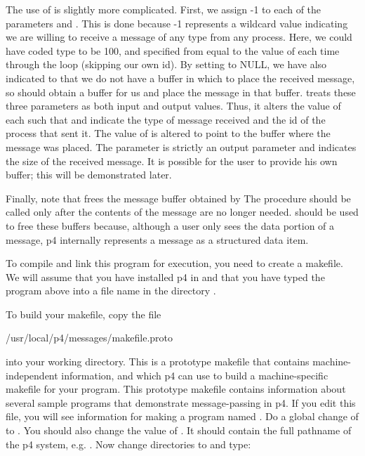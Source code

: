 The use of  is slightly more complicated.  First, we assign -1
to each of the parameters  and .  This is done because
-1 represents a wildcard value indicating we are willing to receive a message
of any type from any process.  Here, we could have coded type to be 100, and
specified from equal to the value of  each time through the loop
(skipping our own id).  By setting  to NULL, we have also
indicated to  that we do not have a buffer in which to place the
received message, so  should obtain a buffer for us and place
the message in that buffer.   treats these three parameters as
both input and output values.  Thus, it alters the value of each such that
 and  indicate the type of message received and the id
of the process that sent it.  The value of  is altered to point
to the buffer where the message was placed.  The  parameter is
strictly an output parameter and indicates the size of the received message.
It is possible for the user to provide his own buffer; this will be
demonstrated later.

Finally, note that  frees the message buffer obtained by
 The procedure  should be called only after
the contents of the message are no longer needed.   should
be used to free these buffers because, although a user only sees the data
portion of a message, p4 internally represents a message as a structured data
item.

To compile and link this program for execution, you need to create a
makefile.  We will assume that you have installed p4 in
 and that you have typed the program above into a
file name  in the directory
.

To build your makefile, copy the file
\begin{example}
    /usr/local/p4/messages/makefile.proto
\end{example}
\noindent
into your working directory.  This is a prototype makefile that
contains machine-independent information, and which p4 can use to build a
machine-specific makefile for your program.  This prototype makefile contains
information about several sample programs that demonstrate
message-passing in p4.  If you edit this file, you will see information
for making a program named .  Do a global change of
 to .  You should also change the value of
.  It should contain the full
pathname of the p4 system, e.g. .  Now change
directories to  and type:

